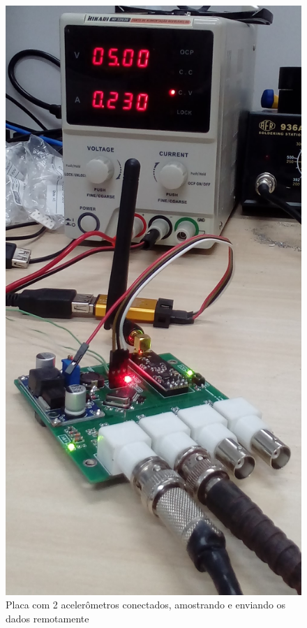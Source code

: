 \documentclass[
	12pt,				%
	openright,			%
	twoside,			%
	a4paper,			%
	english,			%
	french,				%
	spanish,			%
	brazil,				%
	]{abntex2}
\begin{document}
		\begin{figure}[H]
			\centering
			\begin{minipage}{0.4\linewidth}
				\centering
				\includegraphics[width = .8\linewidth]{../Fotos/consumo2.jpg}
				\caption[Placa com 2 acelerômetros]{Placa com 2 acelerômetros conectados, amostrando e enviando os dados remotamente}
			\end{minipage}
			\hfill\vline\hfill
			\begin{minipage}{0.4\linewidth}
				\centering

\end{minipage}
\end{figure}
\end{document}
